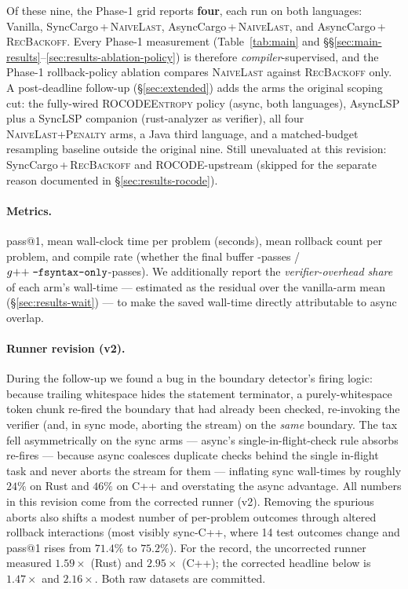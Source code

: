 Of these nine, the Phase-1 grid reports \textbf{four}, each run on
both languages: Vanilla, SyncCargo\,+\,\textsc{NaiveLast},
AsyncCargo\,+\,\textsc{NaiveLast}, and
AsyncCargo\,+\,\textsc{RecBackoff}. Every Phase-1 measurement
(Table~\ref{tab:main} and \S\S\ref{sec:main-results}--\ref{sec:results-ablation-policy})
is therefore \emph{compiler}-supervised, and the Phase-1
rollback-policy ablation compares \textsc{NaiveLast} against
\textsc{RecBackoff} only. A post-deadline follow-up
(\S\ref{sec:extended}) adds the arms the original scoping cut:
the fully-wired \textsc{ROCODEEntropy} policy (async, both
languages), AsyncLSP plus a SyncLSP companion (rust-analyzer as
verifier), all four \textsc{NaiveLast+Penalty} arms, a Java third
language, and a matched-budget resampling baseline outside the
original nine. Still unevaluated at this revision:
SyncCargo\,+\,\textsc{RecBackoff} and ROCODE-upstream (skipped for
the separate reason documented in \S\ref{sec:results-rocode}).

\paragraph{Metrics.}
pass@1, mean wall-clock time per problem (seconds), mean rollback
count per problem, and compile rate (whether the final buffer
-passes / $g{+}{+}\;\texttt{-fsyntax-only}$-passes).
We additionally report the \emph{verifier-overhead share} of each
arm's wall-time --- estimated as the residual over the vanilla-arm
mean (\S\ref{sec:results-wait}) --- to make the saved wall-time
directly attributable to async overlap.

\paragraph{Runner revision (v2).} During the follow-up we found a
bug in the boundary detector's firing logic: because trailing
whitespace hides the statement terminator, a purely-whitespace
token chunk re-fired the boundary that had already been checked,
re-invoking the verifier (and, in sync mode, aborting the stream)
on the \emph{same} boundary. The tax fell asymmetrically on the
sync arms --- async's single-in-flight-check rule absorbs
re-fires --- because async coalesces duplicate checks behind the
single in-flight task and never aborts the stream for them ---
inflating sync wall-times by roughly $24\%$ on Rust
and $46\%$ on C++
and overstating the async advantage. All numbers in this revision
come from the corrected runner (v2). Removing the spurious aborts
also shifts a modest number of per-problem outcomes through
altered rollback interactions (most visibly sync-C++, where 14
test outcomes change and pass@1 rises from $71.4\%$ to $75.2\%$).
For the record, the
uncorrected runner measured $1.59\times$ (Rust) and $2.95\times$
(C++); the corrected headline below is $1.47\times$ and
$2.16\times$. Both raw datasets are committed.

